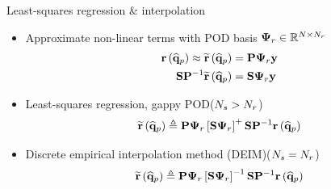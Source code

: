 \documentclass[]{beamer}
\begin{document}
\begin{frame}{Least-squares regression \& interpolation}
    \begin{itemize}
		\item Approximate non-linear terms with POD basis $\deimBasisRes \in \mathbb{R}^{\numDOF \times \numResModes}$
		\begin{align*}
			\resFunc{\primVecCoef} \approx \resApproxFunc{\primVecCoef} &= \consScale \deimBasisRes \dummyVec \\
			\sampMat \consScaleInv \resApproxFunc{\primVecCoef} &= \sampMat \deimBasisRes \dummyVec
		\end{align*}
		\item Least-squares regression, gappy POD\footnotemark[6] ($N_s > N_r$)
		\begin{equation*}
			\resApproxFunc{\primVecCoef} \triangleq \consScale \deimBasisRes \left[ \sampMat \deimBasisRes \right]^{+} \sampMat \consScaleInv \resFunc{\primVecCoef}
		\end{equation*}
		\item Discrete empirical interpolation method (DEIM)\footnotemark[7] ($N_s = N_r$)
		\begin{equation*}
			\resApproxFunc{\primVecCoef} \triangleq \consScale \deimBasisRes \left[ \sampMat \deimBasisRes \right]^{-1} \sampMat \consScaleInv \resFunc{\primVecCoef}
		\end{equation*}
	\end{itemize}
\end{frame}
\end{document}
